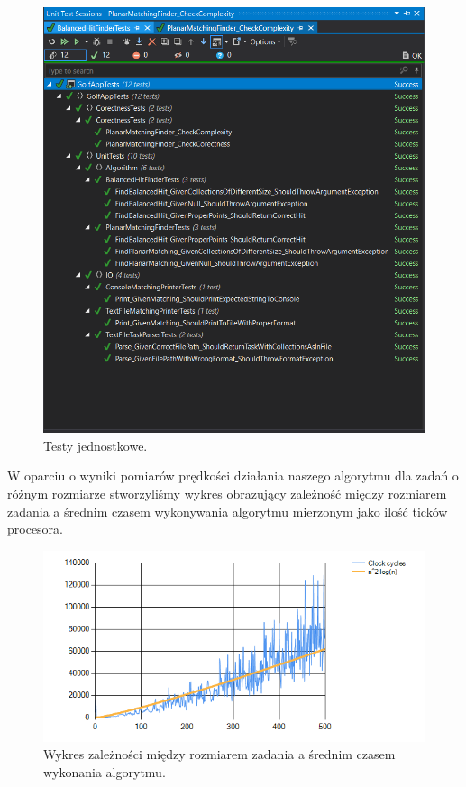 \documentclass[10pt,a4paper]{article}
\begin{document}
	\begin{figure}[H]
		\centering
			\includegraphics[scale=0.6]{images/unittests.png}
 			\caption{Testy jednostkowe.}
 		\label{fig:unit_tests}
	\end{figure}	

	W oparciu o wyniki pomiarów prędkości działania naszego algorytmu dla zadań o różnym rozmiarze stworzyliśmy wykres obrazujący zależność między rozmiarem zadania a średnim czasem wykonywania algorytmu mierzonym jako ilość ticków procesora.
	
	\begin{figure}[H]
		\centering
		\includegraphics[scale=0.8]{images/execution_time_chart.png}
		\caption{Wykres zależności między rozmiarem zadania a średnim czasem wykonania algorytmu.}
		\label{fig:execution_time_chart}
	\end{figure}
	
\end{document}
